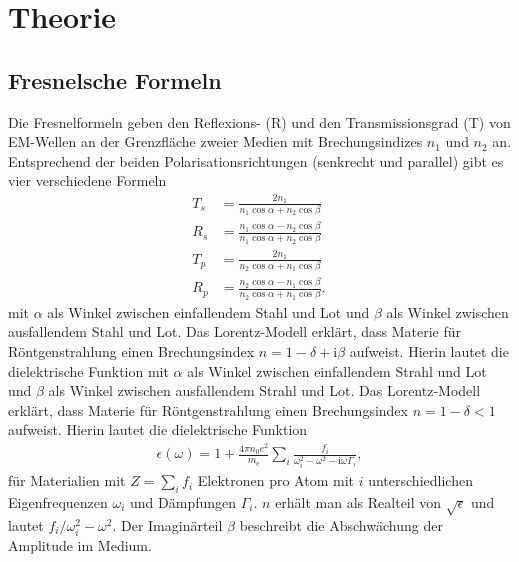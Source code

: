 

\section{Theorie}
\subsection{Fresnelsche Formeln}
Die Fresnelformeln geben den Reflexions- (R) und den Transmissionsgrad (T) von EM-Wellen an der Grenzfläche zweier Medien mit Brechungsindizes $n_1$ und $n_2$ an.
Entsprechend der beiden Polarisationsrichtungen (senkrecht und parallel) gibt es vier verschiedene Formeln
\begin{align}
 T_s &= \frac{2n_1}{n_1 \cos\alpha + n_2\cos\beta}\\
 R_s &= \frac{n_1 \cos\alpha - n_2\cos\beta}{n_1 \cos\alpha + n_2\cos\beta}\\
 T_p &= \frac{2n_1}{n_2 \cos\alpha + n_1\cos\beta}\\
 R_p &= \frac{n_2 \cos\alpha - n_1\cos\beta}{n_2 \cos\alpha + n_1\cos\beta},
\end{align}
\noindent mit $\alpha$ als Winkel zwischen einfallendem Stahl und Lot und $\beta$ als Winkel zwischen ausfallendem Stahl und Lot. Das Lorentz-Modell erklärt,
dass Materie für Röntgenstrahlung einen Brechungsindex $n = 1-\delta + \text{i}\beta$ aufweist. Hierin lautet die dielektrische Funktion
\noindent mit $\alpha$ als Winkel zwischen einfallendem Strahl und Lot und $\beta$ als Winkel zwischen ausfallendem Strahl und Lot. Das Lorentz-Modell erklärt,
dass Materie für Röntgenstrahlung einen Brechungsindex $n = 1-\delta <1$ aufweist. Hierin lautet die dielektrische Funktion
\begin{align}
 \epsilon(\omega) = 1 + \frac{4\pi n_0 e^2}{m_\text{e}} \sum\limits_i \frac{f_i}{\omega_i^2 - \omega^2 - \text{i}\omega\Gamma_i},
\end{align}
für Materialien mit $Z=\sum_i f_i$ Elektronen pro Atom mit $i$ unterschiedlichen Eigenfrequenzen $\omega_i$ und Dämpfungen $\Gamma_i$. $n$ erhält man als
Realteil von $\sqrt{\epsilon}$ und lautet $f_i / \omega_i^2 - \omega^2$. Der Imaginärteil $\beta$ beschreibt die Abschwächung der Amplitude im Medium.

